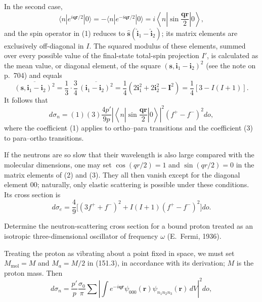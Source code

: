 In the second case,
\[
 \langle n|e^{i\mathbf q\mathbf r/2}|0\rangle
 =-\langle n|e^{-i\mathbf q\mathbf r/2}|0\rangle
 =i\left\langle n\left|\sin\frac{\mathbf q\mathbf r}{2}\right|0\right\rangle,
\]
and the spin operator in (1) reduces to $\hat{\mathbf s}(\hat{\mathbf i}_1-\hat{\mathbf i}_2)$; its matrix elements are exclusively off-diagonal in $I$. The squared modulus of these elements, summed over every possible value of the final-state total-spin projection $I'$, is calculated as the mean value, or diagonal element, of the square $(\mathbf s,\mathbf i_1-\mathbf i_2)^2$ (see the note on p.~704) and equals
\[
 \overline{(\mathbf s,\mathbf i_1-\mathbf i_2)^2}
 =\frac13\cdot\frac34\,\overline{(\mathbf i_1-\mathbf i_2)^2}
 =\frac14(2\mathbf i_1^2+2\mathbf i_2^2-\mathbf I^2)
 =\frac14[3-I(I+1)].
\]
It follows that
\begin{equation}
 d\sigma_n=(1)(3)\frac{4p'}{9p}
 \left|\left\langle n\left|\sin\frac{\mathbf q\mathbf r}{2}\right|0\right\rangle\right|^2(f^+-f^-)^2do,
 \tag{3}
\end{equation}
where the coefficient (1) applies to ortho--para transitions and the coefficient (3) to para--ortho transitions.

If the neutrons are so slow that their wavelength is also large compared with the molecular dimensions, one may set $\cos(qr/2)=1$ and $\sin(qr/2)=0$ in the matrix elements of (2) and (3). They all then vanish except for the diagonal element 00; naturally, only elastic scattering is possible under these conditions. Its cross section is
\[
 d\sigma_e=\frac49\big[(3f^++f^-)^2+I(I+1)(f^+-f^-)^2\big]do.
\]

 Determine the neutron-scattering cross section for a bound proton treated as an isotropic three-dimensional oscillator of frequency $\omega$ (E.~Fermi, 1936).

\SolutionHeading Treating the proton as vibrating about a point fixed in space, we must set $M_\text{mol}=M$ and $M_a=M/2$ in (151.3), in accordance with its derivation; $M$ is the proton mass. Then
\[
 d\sigma_n=\frac{p'}p\frac{\sigma_0}{\pi}\sum
 \left|\int e^{-i\mathbf q\mathbf r}\psi_{000}(\mathbf r)\psi_{n_1n_2n_3}(\mathbf r)\,dV\right|^2do,
\]

